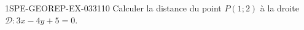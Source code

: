 \begin{exercice}{1SPE-GEOREP-EX-033}{1}{10}
Calculer la distance du point $P(1 ; 2)$ à la droite $\mathcal{D} : 3x - 4y + 5 = 0$.
\end{exercice}
